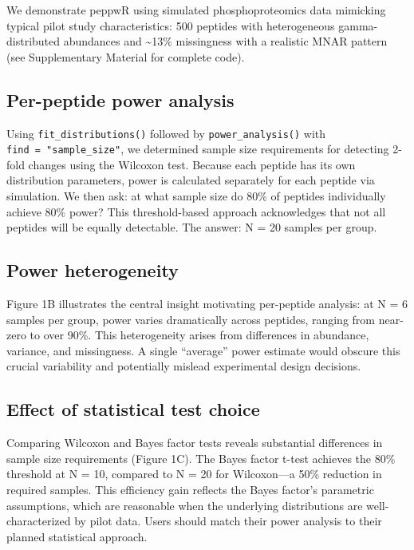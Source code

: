 \documentclass[
]{article}
\begin{document}
We demonstrate peppwR using simulated phosphoproteomics data mimicking
typical pilot study characteristics: 500 peptides with heterogeneous
gamma-distributed abundances and \textasciitilde13\% missingness with a
realistic MNAR pattern (see Supplementary Material for complete code).

\subsection{Per-peptide power
analysis}\label{per-peptide-power-analysis}

Using \texttt{fit\_distributions()} followed by
\texttt{power\_analysis()} with \texttt{find\ =\ "sample\_size"}, we
determined sample size requirements for detecting 2-fold changes using
the Wilcoxon test. Because each peptide has its own distribution
parameters, power is calculated separately for each peptide via
simulation. We then ask: at what sample size do 80\% of peptides
individually achieve 80\% power? This threshold-based approach
acknowledges that not all peptides will be equally detectable. The
answer: N = 20 samples per group.

\subsection{Power heterogeneity}\label{power-heterogeneity}

Figure 1B illustrates the central insight motivating per-peptide
analysis: at N = 6 samples per group, power varies dramatically across
peptides, ranging from near-zero to over 90\%. This heterogeneity arises
from differences in abundance, variance, and missingness. A single
``average'' power estimate would obscure this crucial variability and
potentially mislead experimental design decisions.

\subsection{Effect of statistical test
choice}\label{effect-of-statistical-test-choice}

Comparing Wilcoxon and Bayes factor tests reveals substantial
differences in sample size requirements (Figure 1C). The Bayes factor
t-test achieves the 80\% threshold at N = 10, compared to N = 20 for
Wilcoxon---a 50\% reduction in required samples. This efficiency gain
reflects the Bayes factor's parametric assumptions, which are reasonable
when the underlying distributions are well-characterized by pilot data.
Users should match their power analysis to their planned statistical
approach.
\end{document}
